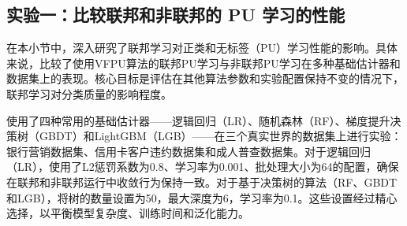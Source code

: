 \subsection{实验一：比较联邦和非联邦的 PU 学习的性能}

在本小节中，深入研究了联邦学习对正类和无标签（PU）学习性能的影响。具体来说，比较了使用VFPU算法的联邦PU学习与非联邦PU学习在多种基础估计器和数据集上的表现。核心目标是评估在其他算法参数和实验配置保持不变的情况下，联邦学习对分类质量的影响程度。

使用了四种常用的基础估计器——逻辑回归（LR）、随机森林（RF）、梯度提升决策树（GBDT）和LightGBM（LGB）——在三个真实世界的数据集上进行实验：银行营销数据集、信用卡客户违约数据集和成人普查数据集。对于逻辑回归（LR），使用了L2惩罚系数为0.8、学习率为0.001、批处理大小为64的配置，确保在联邦和非联邦运行中收敛行为保持一致。对于基于决策树的算法（RF、GBDT和LGB），将树的数量设置为50，最大深度为6，学习率为0.1。这些设置经过精心选择，以平衡模型复杂度、训练时间和泛化能力。

